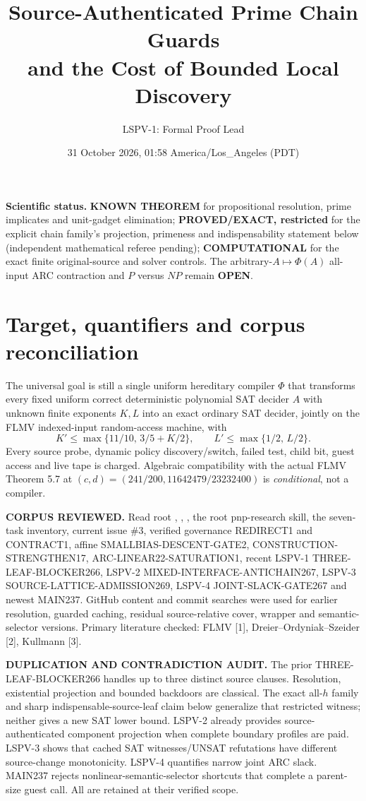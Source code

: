 \documentclass[11pt]{article}
\title{Source-Authenticated Prime Chain Guards\\and the Cost of Bounded Local Discovery}
\author{LSPV-1: Formal Proof Lead}
\date{31 October 2026, 01:58 America/Los\_Angeles (PDT)}
\begin{document}
\maketitle

\noindent\textbf{Scientific status.}
\textbf{KNOWN THEOREM} for propositional resolution, prime implicates and
unit-gadget elimination; \textbf{PROVED/EXACT, restricted} for the explicit
chain family's projection, primeness and indispensability statement below
(independent mathematical referee pending);
\textbf{COMPUTATIONAL} for the exact finite original-source and solver
controls. The arbitrary-$A\mapsto\Phi(A)$ all-input ARC contraction and
$P$ versus $NP$ remain \textbf{OPEN}.

\section{Target, quantifiers and corpus reconciliation}
The universal goal is still a single uniform hereditary compiler
$\Phi$ that transforms every fixed uniform correct deterministic polynomial
SAT decider $A$ with unknown finite exponents $K,L$ into an exact ordinary
SAT decider, jointly on the FLMV indexed-input random-access machine, with
\[
K'\le\max\{11/10,\,3/5+K/2\},\qquad
L'\le\max\{1/2,\,L/2\}.
\tag{1}
\]
Every source probe, dynamic policy discovery/switch, failed test, child
bit, guest access and live tape is charged. Algebraic compatibility with
the actual FLMV Theorem 5.7 at
$(c,d)=(241/200,11642479/23232400)$ is \emph{conditional}, not a compiler.

\noindent\textbf{CORPUS REVIEWED.}
Read root , , ,
the root pnp-research skill, the seven-task inventory, current issue
\#3, verified governance REDIRECT1 and CONTRACT1, affine
SMALLBIAS-DESCENT-GATE2, CONSTRUCTION-STRENGTHEN17,
ARC-LINEAR22-SATURATION1, recent LSPV-1 THREE-LEAF-BLOCKER266,
LSPV-2 MIXED-INTERFACE-ANTICHAIN267, LSPV-3 SOURCE-LATTICE-ADMISSION269,
LSPV-4 JOINT-SLACK-GATE267 and newest MAIN237.
GitHub content and commit searches were used for earlier
resolution, guarded caching, residual source-relative cover,
wrapper and semantic-selector versions. Primary literature checked:
FLMV [1], Dreier--Ordyniak--Szeider [2], Kullmann [3].

\noindent\textbf{DUPLICATION AND CONTRADICTION AUDIT.}
The prior THREE-LEAF-BLOCKER266 handles up to three distinct source
clauses. Resolution, existential projection and bounded backdoors are
classical. The exact all-$h$ family and sharp indispensable-source-leaf
claim below generalize that restricted witness; neither gives a new
SAT lower bound. LSPV-2 already provides source-authenticated component
projection when complete boundary profiles are paid. LSPV-3 shows that
cached SAT witnesses/UNSAT refutations have different source-change
monotonicity. LSPV-4 quantifies narrow joint ARC slack.
MAIN237 rejects nonlinear-semantic-selector shortcuts that complete a
parent-size guest call. All are retained at their verified scope.
\end{document}
